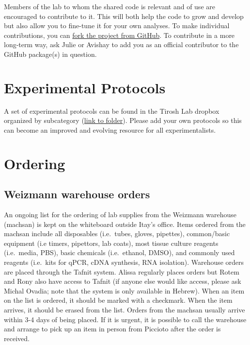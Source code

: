 \documentclass[]{book}
\begin{document}
Members of the lab to whom the shared code is relevant and of use are
encouraged to contribute to it. This will both help the code to grow and
develop but also allow you to fine-tune it for your own analyses. To
make individual contributions, you can
\href{https://help.github.com/en/github/getting-started-with-github/fork-a-repo}{fork
the project from GitHub}. To contribute in a more long-term way, ask
Julie or Avishay to add you as an official contributor to the GitHub
package(s) in question.

\chapter{Experimental Protocols}\label{protocols}

A set of experimental protocols can be found in the Tirosh Lab dropbox
organized by subcategory
(\href{https://www.dropbox.com/sh/javjoi26i5k5f6t/AADAX4RgSZUFuBwtS6TRE3wua?dl=0}{link
to folder}). Please add your own protocols so this can become an
improved and evolving resource for all experimentalists.

\chapter{Ordering}\label{ordering}

\section{Weizmann warehouse orders}\label{weizmann-warehouse-orders}

An ongoing list for the ordering of lab supplies from the Weizmann
warehouse (machsan) is kept on the whiteboard outside Itay's office.
Items ordered from the machsan include all disposables (i.e.~tubes,
gloves, pipettes), common/basic equipment (i.e timers, pipettors, lab
coats), most tissue culture reagents (i.e.~media, PBS), basic chemicals
(i.e.~ethanol, DMSO), and commonly used reagents (i.e.~kits for qPCR,
cDNA synthesis, RNA isolation). Warehouse orders are placed through the
Tafnit system. Alissa regularly places orders but Rotem and Rony also
have access to Tafnit (if anyone else would like access, please ask
Michal Ovadia; note that the system is only available in Hebrew). When
an item on the list is ordered, it should be marked with a checkmark.
When the item arrives, it should be erased from the list. Orders from
the machsan usually arrive within 3-4 days of being placed. If it is
urgent, it is possible to call the warehouse and arrange to pick up an
item in person from Piccioto after the order is received.
\end{document}
